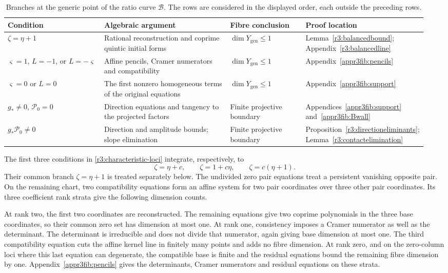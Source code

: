 \documentclass[11pt,a4paper]{article}
\numberwithin{equation}{section}
\theoremstyle{plain}
\theoremstyle{definition}
\theoremstyle{remark}
\begin{document}
\begin{table}[htbp]
\centering
\small
\renewcommand{\arraystretch}{1.12}
\setlength{\tabcolsep}{3pt}
\caption{Branches at the generic point of the ratio curve
$\mathscr B$. The rows are considered in the displayed order,
each outside the preceding rows.}
\label{tab:ratio-branches}
\begin{tabular}{@{}>{\raggedright\arraybackslash}p{0.23\linewidth}>{\raggedright\arraybackslash}p{0.30\linewidth}>{\raggedright\arraybackslash}p{0.18\linewidth}>{\raggedright\arraybackslash}p{0.24\linewidth}@{}}
\toprule
Condition & Algebraic argument & Fibre conclusion & Proof location\\
\midrule
$\zeta=\eta+1$ &
Rational reconstruction and coprime quintic initial forms &
$\dim Y_{\mathrm{gen}}\le1$ &
Lemma~\ref{r3:balancedbound}; Appendix~\ref{r3:balancedline}\\
\addlinespace
$\varsigma=1$, $L=-1$, or $L=-\varsigma$ &
Affine pencils, Cramer numerators and compatibility &
$\dim Y_{\mathrm{gen}}\le1$ &
Appendix~\ref{appr3fib:pencils}\\
\addlinespace
$\varsigma=0$ or $L=0$ &
The first nonzero homogeneous terms of the original equations &
$\dim Y_{\mathrm{gen}}\le1$ &
Appendix~\ref{appr3fib:support}\\
\addlinespace
$g_*\ne0$, $\mathcal P_0=0$ &
Direction equations and tangency to the projected factors &
Finite projective boundary &
Appendices~\ref{appr3fib:support} and~\ref{appr3fib:Bwall}\\
\addlinespace
$g_*\mathcal P_0\ne0$ &
Direction and amplitude bounds; slope elimination &
Finite projective boundary &
Proposition~\ref{r3:directioneliminants}; Lemma~\ref{r3:contactelimination}\\
\bottomrule
\end{tabular}
\end{table}

The first three conditions in \eqref{r3:characteristic-loci}
integrate, respectively, to
\[
 \zeta=\eta+c,\qquad \zeta=1+c\eta,\qquad
 \zeta=c(\eta+1).
\]
Their common branch $\zeta=\eta+1$ is treated separately below.
The undivided zero pair equations treat a persistent vanishing
opposite pair. On the remaining chart, two compatibility
equations form an affine system for two pair coordinates over
three other pair coordinates. Its three coefficient rank strata
give the following dimension counts.

At rank two, the first two coordinates are reconstructed.
The remaining equations give two coprime polynomials in the
three base coordinates, so their common zero set has dimension
at most one. At rank one, consistency imposes a Cramer numerator
as well as the determinant. The determinant is irreducible and
does not divide that numerator, again giving base dimension at
most one. The third compatibility equation cuts the affine
kernel line in finitely many points and adds no fibre dimension.
At rank zero, and on the zero-column loci where this last
equation can degenerate, the compatible base is finite and the
residual equations bound the remaining fibre dimension by one.
Appendix~\ref{appr3fib:pencils} gives the determinants, Cramer
numerators and residual equations on these strata.
\end{document}
